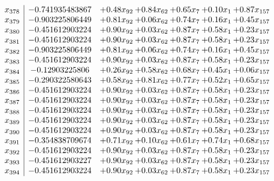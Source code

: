 \documentclass[8pt]{article}
\begin{document}
\[\begin{array}{c| c c@{\hskip 2pt} c@{\hskip 2pt} c@{\hskip 2pt} c@{\hskip 2pt} c@{\hskip 2pt} }
 x_{378}   &  -0.741935483867 & +  0.48 x_{92} & +  0.84 x_{62} & +  0.65 x_{7} & +  0.10 x_{1} & +  0.87 x_{157}\\
 x_{379}   &  -0.903225806449 & +  0.81 x_{92} & +  0.06 x_{62} & +  0.74 x_{7} & +  0.16 x_{1} & +  0.45 x_{157}\\
 x_{380}   &  -0.451612903224 & +  0.90 x_{92} & +  0.03 x_{62} & +  0.87 x_{7} & +  0.58 x_{1} & +  0.23 x_{157}\\
 x_{381}   &  -0.451612903224 & +  0.90 x_{92} & +  0.03 x_{62} & +  0.87 x_{7} & +  0.58 x_{1} & +  0.23 x_{157}\\
 x_{382}   &  -0.903225806449 & +  0.81 x_{92} & +  0.06 x_{62} & +  0.74 x_{7} & +  0.16 x_{1} & +  0.45 x_{157}\\
 x_{383}   &  -0.451612903224 & +  0.90 x_{92} & +  0.03 x_{62} & +  0.87 x_{7} & +  0.58 x_{1} & +  0.23 x_{157}\\
 x_{384}   &  -0.12903225806 & +  0.26 x_{92} & +  0.58 x_{62} & +  0.68 x_{7} & +  0.45 x_{1} & +  0.06 x_{157}\\
 x_{385}   &  -0.290322580643 & +  0.58 x_{92} & +  0.81 x_{62} & +  0.77 x_{7} & +  0.52 x_{1} & +  0.65 x_{157}\\
 x_{386}   &  -0.451612903224 & +  0.90 x_{92} & +  0.03 x_{62} & +  0.87 x_{7} & +  0.58 x_{1} & +  0.23 x_{157}\\
 x_{387}   &  -0.451612903224 & +  0.90 x_{92} & +  0.03 x_{62} & +  0.87 x_{7} & +  0.58 x_{1} & +  0.23 x_{157}\\
 x_{388}   &  -0.451612903224 & +  0.90 x_{92} & +  0.03 x_{62} & +  0.87 x_{7} & +  0.58 x_{1} & +  0.23 x_{157}\\
 x_{389}   &  -0.451612903224 & +  0.90 x_{92} & +  0.03 x_{62} & +  0.87 x_{7} & +  0.58 x_{1} & +  0.23 x_{157}\\
 x_{390}   &  -0.451612903224 & +  0.90 x_{92} & +  0.03 x_{62} & +  0.87 x_{7} & +  0.58 x_{1} & +  0.23 x_{157}\\
 x_{391}   &  -0.354838709674 & +  0.71 x_{92} & +  0.10 x_{62} & +  0.61 x_{7} & +  0.74 x_{1} & +  0.68 x_{157}\\
 x_{392}   &  -0.451612903224 & +  0.90 x_{92} & +  0.03 x_{62} & +  0.87 x_{7} & +  0.58 x_{1} & +  0.23 x_{157}\\
 x_{393}   &  -0.451612903227 & +  0.90 x_{92} & +  0.03 x_{62} & +  0.87 x_{7} & +  0.58 x_{1} & +  0.23 x_{157}\\
 x_{394}   &  -0.451612903224 & +  0.90 x_{92} & +  0.03 x_{62} & +  0.87 x_{7} & +  0.58 x_{1} & +  0.23 x_{157}\\

\end{array}\]
\end{document}
